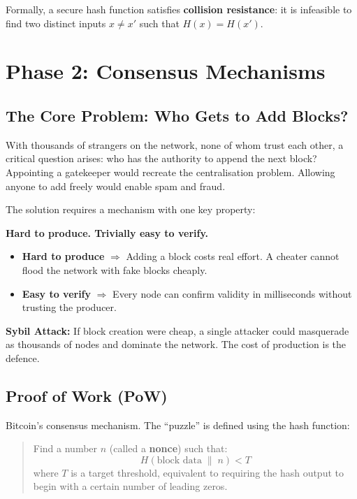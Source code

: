 \documentclass[12pt, a4paper]{article}
\begin{document}
Formally, a secure hash function satisfies \textbf{collision resistance}: it is
infeasible to find two distinct inputs $x \neq x'$ such that $H(x) = H(x')$.

\section{Phase 2: Consensus Mechanisms}

\subsection{The Core Problem: Who Gets to Add Blocks?}

With thousands of strangers on the network, none of whom trust each other, a critical
question arises: who has the authority to append the next block? Appointing a gatekeeper
would recreate the centralisation problem. Allowing anyone to add freely would enable
spam and fraud.

The solution requires a mechanism with one key property:

\begin{center}
\textbf{Hard to produce. Trivially easy to verify.}
\end{center}

\begin{itemize}
    \item \textbf{Hard to produce} $\Rightarrow$ Adding a block costs real effort.
          A cheater cannot flood the network with fake blocks cheaply.
    \item \textbf{Easy to verify} $\Rightarrow$ Every node can confirm validity in
          milliseconds without trusting the producer.
\end{itemize}

\textbf{Sybil Attack:} If block creation were cheap, a single attacker could
masquerade as thousands of nodes and dominate the network. The cost of
production is the defence.

\subsection{Proof of Work (PoW)}

Bitcoin's consensus mechanism. The ``puzzle'' is defined using the hash function:

\begin{quote}
    Find a number $n$ (called a \textbf{nonce}) such that:
    \[
        H(\text{block data} \;\|\; n) < T
    \]
    where $T$ is a target threshold, equivalent to requiring the hash output
    to begin with a certain number of leading zeros.
\end{quote}
\end{document}
